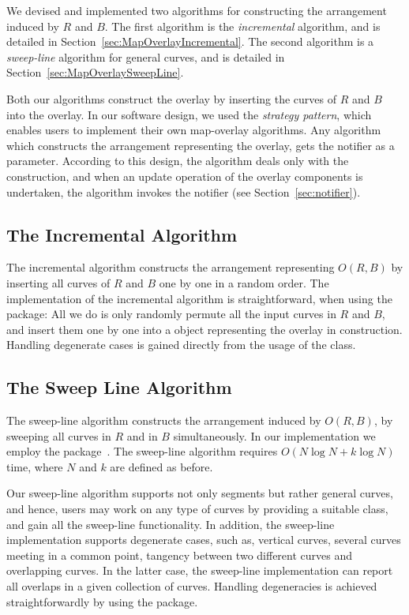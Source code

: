 \begin{ccTexOnly}
We devised and implemented two algorithms for constructing the 
arrangement induced by $R$ and $B$.
The first algorithm is the {\em incremental} algorithm, and is detailed in Section~\ref{sec:MapOverlayIncremental}. 
The second algorithm is a {\em sweep-line} algorithm 
for general curves, and is detailed in 
Section~\ref{sec:MapOverlaySweepLine}.

Both our algorithms construct the overlay by inserting 
the curves of $R$ and $B$ into the overlay.
In our software design, we used the {\it strategy pattern}, 
which enables users to implement their own map-overlay algorithms.
Any algorithm which constructs the arrangement representing 
the overlay, gets the notifier as a parameter. 
According to this design, the algorithm deals only with the construction, 
and when an update operation of the overlay components is undertaken, 
the algorithm invokes the notifier (see Section~\ref{sec:notifier}). 

\subsection*{The Incremental Algorithm}
\label{sec:MapOverlayIncremental}
The incremental algorithm constructs the arrangement representing 
$O(R,B)$ by inserting all curves of $R$ and $B$ one by one in a 
random order. 
The implementation of the incremental algorithm is straightforward, 
when using the  package: All we 
do is only randomly permute all the input curves in $R$ and $B$, 
and insert them one by one into a 
 object representing the 
overlay in construction.
Handling degenerate cases is gained directly from the usage of the 
 class.

\subsection*{The Sweep Line Algorithm}
\label{sec:MapOverlaySweepLine}
The sweep-line algorithm constructs the arrangement induced by $O(R,B)$, 
by sweeping all curves in $R$ and in $B$ simultaneously. 
In our implementation we employ the  
package~. 
The sweep-line algorithm requires $O(N\log{N} + k\log{N})$ time,
where $N$ and $k$ are defined as before.

Our sweep-line algorithm supports not only segments but rather 
general curves, and hence, users may work on any type of curves by 
providing a suitable  class, and 
gain all the sweep-line functionality.
In addition, the sweep-line implementation supports degenerate cases, 
such as, vertical curves, several curves meeting in a common point, 
tangency between two different curves and overlapping curves.
In the latter case, the sweep-line implementation can report all overlaps
in a given collection of curves.
Handling degeneracies is achieved straightforwardly by using the 
 package.


\end{ccTexOnly}
